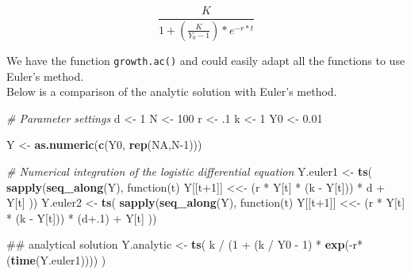 \documentclass[]{book}
\newenvironment{Shaded}{\begin{snugshade}}{\end{snugshade}}
\newcommand{\KeywordTok}[1]{\textcolor[rgb]{0.13,0.29,0.53}{\textbf{{#1}}}}
\newcommand{\DecValTok}[1]{\textcolor[rgb]{0.00,0.00,0.81}{{#1}}}
\newcommand{\FloatTok}[1]{\textcolor[rgb]{0.00,0.00,0.81}{{#1}}}
\newcommand{\StringTok}[1]{\textcolor[rgb]{0.31,0.60,0.02}{{#1}}}
\newcommand{\CommentTok}[1]{\textcolor[rgb]{0.56,0.35,0.01}{\textit{{#1}}}}
\newcommand{\OtherTok}[1]{\textcolor[rgb]{0.56,0.35,0.01}{{#1}}}
\newcommand{\NormalTok}[1]{{#1}}
\begin{document}
\begin{equation}
\frac{K}{1 + \left(\frac{K}{Y_0 - 1}\right) * e^{-r*t} }
\label{eq:logSol}
\end{equation}

We have the function \texttt{growth.ac()} and could easily adapt all the
functions to use Euler's method.\\
Below is a comparison of the analytic solution with Euler's method.

\begin{Shaded}
\begin{Highlighting}[]
\CommentTok{# Parameter settings}
\NormalTok{d <-}\StringTok{ }\DecValTok{1}
\NormalTok{N <-}\StringTok{ }\DecValTok{100}
\NormalTok{r <-}\StringTok{ }\NormalTok{.}\DecValTok{1}
\NormalTok{k <-}\StringTok{ }\DecValTok{1}
\NormalTok{Y0 <-}\StringTok{ }\FloatTok{0.01}

\NormalTok{Y <-}\StringTok{ }\KeywordTok{as.numeric}\NormalTok{(}\KeywordTok{c}\NormalTok{(Y0, }\KeywordTok{rep}\NormalTok{(}\OtherTok{NA}\NormalTok{,N}\DecValTok{-1}\NormalTok{)))}

\CommentTok{# Numerical integration of the logistic differential equation}
\NormalTok{Y.euler1 <-}\StringTok{ }\KeywordTok{ts}\NormalTok{( }\KeywordTok{sapply}\NormalTok{(}\KeywordTok{seq_along}\NormalTok{(Y), function(t) Y[[t}\DecValTok{+1}\NormalTok{]] <<-}\StringTok{ }\NormalTok{(r *}\StringTok{ }\NormalTok{Y[t] *}\StringTok{ }\NormalTok{(k -}\StringTok{ }\NormalTok{Y[t])) *}\StringTok{ }\NormalTok{d +}\StringTok{ }\NormalTok{Y[t] )) }
\NormalTok{Y.euler2 <-}\StringTok{ }\KeywordTok{ts}\NormalTok{( }\KeywordTok{sapply}\NormalTok{(}\KeywordTok{seq_along}\NormalTok{(Y), function(t) Y[[t}\DecValTok{+1}\NormalTok{]] <<-}\StringTok{ }\NormalTok{(r *}\StringTok{ }\NormalTok{Y[t] *}\StringTok{ }\NormalTok{(k -}\StringTok{ }\NormalTok{Y[t])) *}\StringTok{ }\NormalTok{(d}\FloatTok{+.1}\NormalTok{) +}\StringTok{ }\NormalTok{Y[t] )) }

\NormalTok{## analytical solution}
\NormalTok{Y.analytic <-}\StringTok{ }\KeywordTok{ts}\NormalTok{( k /}\StringTok{ }\NormalTok{(}\DecValTok{1} \NormalTok{+}\StringTok{ }\NormalTok{(k /}\StringTok{ }\NormalTok{Y0 -}\StringTok{ }\DecValTok{1}\NormalTok{) *}\StringTok{ }\KeywordTok{exp}\NormalTok{(-r*(}\KeywordTok{time}\NormalTok{(Y.euler1)))) )}


\end{Highlighting}
\end{Shaded}
\end{document}

